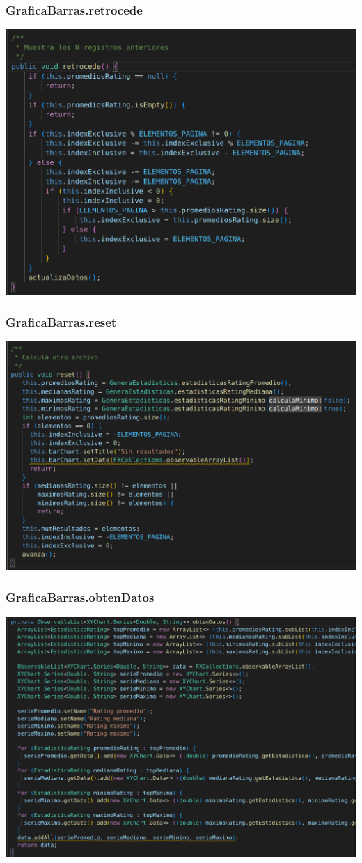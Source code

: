 \documentclass{beamer}
\begin{document}
\begin{frame}
\frametitle{GraficaBarras.retrocede}
\includegraphics[width=\linewidth]{graficabarras_retrocede}
\end{frame}

\begin{frame}
\frametitle{GraficaBarras.reset}
\includegraphics[width=\linewidth]{graficabarras_reset}
\end{frame}

\begin{frame}
\frametitle{GraficaBarras.obtenDatos}
\includegraphics[width=\linewidth]{graficabarras_obtendatos}
\end{frame}
\end{document}
